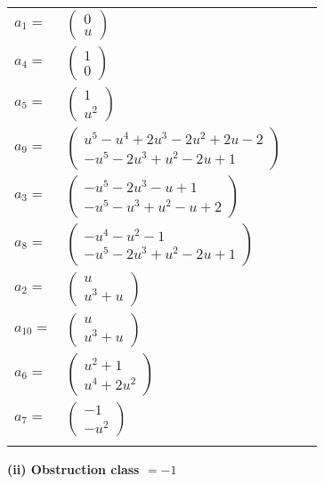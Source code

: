 \documentclass[1p]{elsarticle_modified}
\theoremstyle{definition}
\begin{document}
\begin{tabular}{m{7pt} m{180pt} m{7pt} m{180pt} }
\flushright $a_{1}=$&$\begin{pmatrix}0\\u\end{pmatrix}$ \\
\flushright $a_{4}=$&$\begin{pmatrix}1\\0\end{pmatrix}$ \\
\flushright $a_{5}=$&$\begin{pmatrix}1\\u^2\end{pmatrix}$ \\
\flushright $a_{9}=$&$\begin{pmatrix}u^5- u^4+2 u^3-2 u^2+2 u-2\\- u^5-2 u^3+u^2-2 u+1\end{pmatrix}$ \\
\flushright $a_{3}=$&$\begin{pmatrix}- u^5-2 u^3- u+1\\- u^5- u^3+u^2- u+2\end{pmatrix}$ \\
\flushright $a_{8}=$&$\begin{pmatrix}- u^4- u^2-1\\- u^5-2 u^3+u^2-2 u+1\end{pmatrix}$ \\
\flushright $a_{2}=$&$\begin{pmatrix}u\\u^3+u\end{pmatrix}$ \\
\flushright $a_{10}=$&$\begin{pmatrix}u\\u^3+u\end{pmatrix}$ \\
\flushright $a_{6}=$&$\begin{pmatrix}u^2+1\\u^4+2 u^2\end{pmatrix}$ \\
\flushright $a_{7}=$&$\begin{pmatrix}-1\\- u^2\end{pmatrix}$\\&\end{tabular}
\flushleft \textbf{(ii) Obstruction class $= -1$}\\~\\
\end{document}
